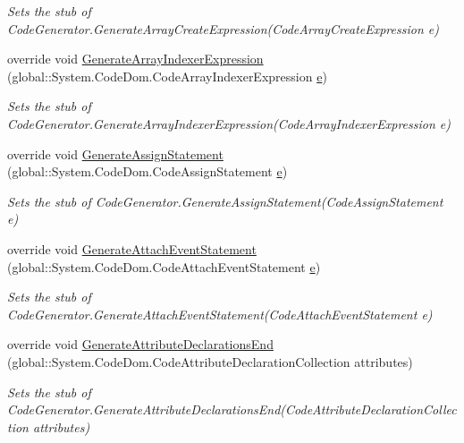 \begin{DoxyCompactItemize}
\begin{DoxyCompactList}\small\item\em Sets the stub of Code\-Generator.\-Generate\-Array\-Create\-Expression(\-Code\-Array\-Create\-Expression e)\end{DoxyCompactList}\item 
override void \hyperlink{class_system_1_1_code_dom_1_1_compiler_1_1_fakes_1_1_stub_code_generator_af6a75019e29c4d671ef082247f78de8a}{Generate\-Array\-Indexer\-Expression} (global\-::\-System.\-Code\-Dom.\-Code\-Array\-Indexer\-Expression \hyperlink{jquery-1_810_82_8min_8js_a2c038346d47955cbe2cb91e338edd7e1}{e})
\begin{DoxyCompactList}\small\item\em Sets the stub of Code\-Generator.\-Generate\-Array\-Indexer\-Expression(\-Code\-Array\-Indexer\-Expression e)\end{DoxyCompactList}\item 
override void \hyperlink{class_system_1_1_code_dom_1_1_compiler_1_1_fakes_1_1_stub_code_generator_a2121c864e27ba673b59748313be769c7}{Generate\-Assign\-Statement} (global\-::\-System.\-Code\-Dom.\-Code\-Assign\-Statement \hyperlink{jquery-1_810_82_8min_8js_a2c038346d47955cbe2cb91e338edd7e1}{e})
\begin{DoxyCompactList}\small\item\em Sets the stub of Code\-Generator.\-Generate\-Assign\-Statement(\-Code\-Assign\-Statement e)\end{DoxyCompactList}\item 
override void \hyperlink{class_system_1_1_code_dom_1_1_compiler_1_1_fakes_1_1_stub_code_generator_a217876c148d4526e910ebe4eae2f0503}{Generate\-Attach\-Event\-Statement} (global\-::\-System.\-Code\-Dom.\-Code\-Attach\-Event\-Statement \hyperlink{jquery-1_810_82_8min_8js_a2c038346d47955cbe2cb91e338edd7e1}{e})
\begin{DoxyCompactList}\small\item\em Sets the stub of Code\-Generator.\-Generate\-Attach\-Event\-Statement(\-Code\-Attach\-Event\-Statement e)\end{DoxyCompactList}\item 
override void \hyperlink{class_system_1_1_code_dom_1_1_compiler_1_1_fakes_1_1_stub_code_generator_a01d17a3e08c99a3dfb6be3e470ada2c3}{Generate\-Attribute\-Declarations\-End} (global\-::\-System.\-Code\-Dom.\-Code\-Attribute\-Declaration\-Collection attributes)
\begin{DoxyCompactList}\small\item\em Sets the stub of Code\-Generator.\-Generate\-Attribute\-Declarations\-End(\-Code\-Attribute\-Declaration\-Collection attributes)\end{DoxyCompactList}\item 

\end{DoxyCompactItemize}

